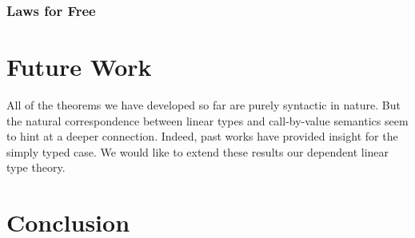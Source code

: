 \documentclass{article}
\theoremstyle{definition}
\begin{document}
  \subsubsection{Laws for Free}

  \section{Future Work}
  All of the theorems we have developed so far are purely syntactic in nature. But the natural correspondence between linear types and call-by-value semantics seem to hint at a deeper connection. Indeed, past works\cite{cbvsemantics} have provided insight for the simply typed case. We would like to extend these results our dependent linear type theory.

  \section{Conclusion}



\end{document}
